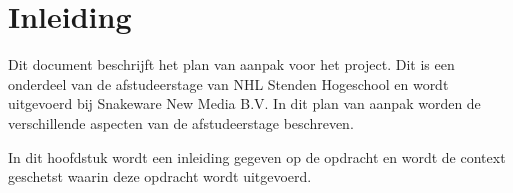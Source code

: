 \chapter{Inleiding}
Dit document beschrijft het plan van aanpak voor het \qw{\ProjectName} project.
Dit is een onderdeel van de afstudeerstage van NHL Stenden Hogeschool en wordt uitgevoerd bij Snakeware New Media B.V.
In dit plan van aanpak worden de verschillende aspecten van de afstudeerstage beschreven.

\whitespace
In dit hoofdstuk wordt een inleiding gegeven op de opdracht en wordt de context geschetst waarin deze opdracht wordt uitgevoerd.



% 
% 
